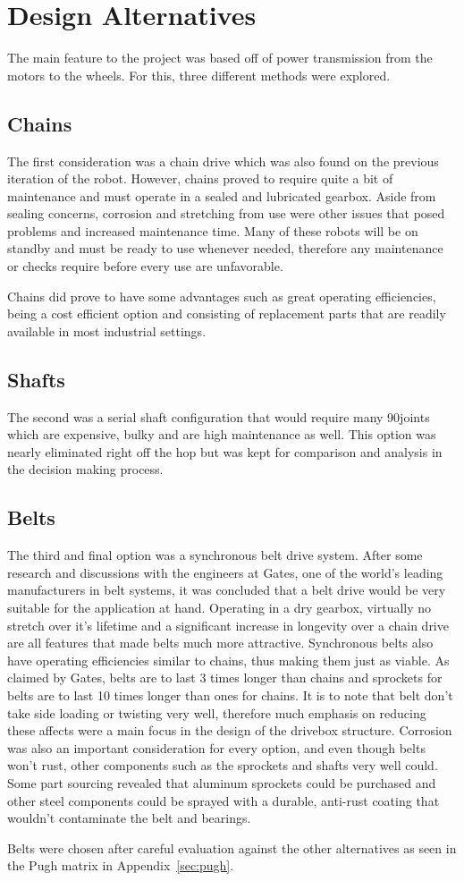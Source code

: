 \section {Design Alternatives}
The main feature to the project was based off of power transmission from the motors to the wheels. For this, three different methods were explored. 

\subsection{Chains}
The first consideration was a chain drive which was also found on the previous iteration of the robot. However, chains proved to require quite a bit of maintenance and must operate in a sealed and lubricated gearbox. Aside from sealing concerns, corrosion and stretching from use were other issues that posed problems and increased maintenance time. Many of these robots will be on standby and must be ready to use whenever needed, therefore any maintenance or checks require before every use are unfavorable. 

Chains did prove to have some advantages such as great operating efficiencies, being a cost efficient option and consisting of replacement parts that are readily available in most industrial settings.

\subsection{Shafts}
The second was a serial shaft configuration that would require many 90\degree joints which are expensive, bulky and are high maintenance as well. This option was nearly eliminated right off the hop but was kept for comparison and analysis in the decision making process. 

\subsection{Belts}
The third and final option was a synchronous belt drive system. After some research and discussions with the engineers at Gates, one of the world's leading manufacturers in belt systems, it was concluded that a belt drive would be very suitable for the application at hand. Operating in a dry gearbox, virtually no stretch over it's lifetime and a significant increase in longevity over a chain drive are all features that made belts much more attractive. Synchronous belts also have operating efficiencies similar to chains, thus making them just as viable. As claimed by Gates, belts are to last 3 times longer than chains and sprockets for belts are to last 10 times longer than ones for chains. It is to note that belt don't take side loading or twisting very well, therefore much emphasis on reducing these affects were a main focus in the design of the drivebox structure. Corrosion was also an important consideration for every option, and even though belts won't rust, other components such as the sprockets and shafts very well could. Some part sourcing revealed that aluminum sprockets could be purchased and other steel components could be sprayed with a durable, anti-rust coating that wouldn't contaminate the belt and bearings.

Belts were chosen after careful evaluation against the other alternatives as seen in the Pugh matrix in Appendix~\ref{sec:pugh}.





